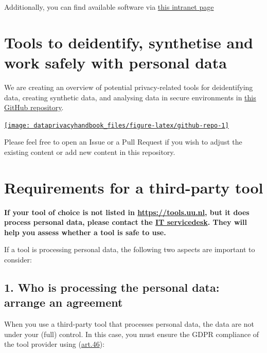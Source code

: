 \documentclass[
]{book}
\begin{document}
Additionally, you can find available software via
\href{https://intranet.uu.nl/en/knowledgebase/software-at-work-teaching-rooms-and-home}{this intranet page}

\hypertarget{tool-repository}{%
\section{Tools to deidentify, synthetise and work safely with personal data}\label{tool-repository}}

We are creating an overview of potential privacy-related tools for
deidentifying data, creating synthetic data, and analysing data in secure
environments in
\href{https://github.com/UtrechtUniversity/privacy-engineering-tools/}{this GitHub repository}.

\begin{center}\href{https://github.com/UtrechtUniversity/privacy-engineering-tools/}{\texttt{[image: dataprivacyhandbook\_files/figure-latex/github-repo-1]} }\end{center}

Please feel free to open an Issue or a Pull Request if you wish to adjust the
existing content or add new content in this repository.

\hypertarget{tool-requirements}{%
\section{Requirements for a third-party tool}\label{tool-requirements}}

\textbf{If your tool of choice is not listed in \url{https://tools.uu.nl}, but it does
process personal data, please contact the
\href{https://www.uu.nl/en/organisation/information-and-technology-services-its/i-want-to/get-help-and-advice}{IT servicedesk}.
They will help you assess whether a tool is safe to use.}

If a tool is processing personal data, the following two aspects are important to consider:

\hypertarget{who-is-processing-the-personal-data-arrange-an-agreement}{%
\subsection{1. Who is processing the personal data: arrange an agreement}\label{who-is-processing-the-personal-data-arrange-an-agreement}}

When you use a third-party tool that processes personal data, the data are not
under your (full) control. In this case, you must ensure the GDPR compliance of
the tool provider using (\href{https://gdpr-info.eu/art-46-gdpr/}{art.46}):
\end{document}
